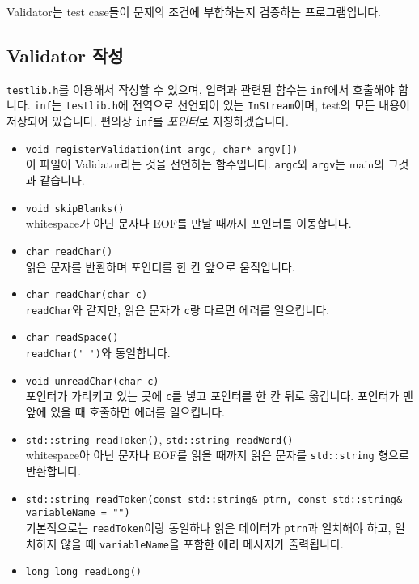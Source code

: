 \documentclass{article}
\begin{document}
    Validator는 test case들이 문제의 조건에 부합하는지 검증하는 프로그램입니다.
    \subsection{Validator 작성}
    \verb|testlib.h|를 이용해서 작성할 수 있으며, 입력과 관련된 함수는 \verb|inf|에서 호출해야 합니다. \verb|inf|는 \verb|testlib.h|에 전역으로 선언되어 있는 \verb|InStream|이며, test의 모든 내용이 저장되어 있습니다. 편의상 \verb|inf|를 \textit{포인터}로 지칭하겠습니다.
    \begin{itemize}
        \item \verb|void registerValidation(int argc, char* argv[])|\\
        이 파일이 Validator라는 것을 선언하는 함수입니다. \verb|argc|와 \verb|argv|는 main의 그것과 같습니다.
        \item \verb|void skipBlanks()|\\
        whitespace가 아닌 문자나 EOF를 만날 때까지 포인터를 이동합니다.
        \item \verb|char readChar()|\\
        읽은 문자를 반환하며 포인터를 한 칸 앞으로 움직입니다.
        \item \verb|char readChar(char c)|\\
        \verb|readChar|와 같지만, 읽은 문자가 \verb|c|랑 다르면 에러를 일으킵니다.
        \item \verb|char readSpace()|\\
        \verb|readChar(' ')|와 동일합니다.
        \item \verb|void unreadChar(char c)|\\
        포인터가 가리키고 있는 곳에 \verb|c|를 넣고 포인터를 한 칸 뒤로 옮깁니다. 포인터가 맨 앞에 있을 때 호출하면 에러를 일으킵니다.
        \item \verb|std::string readToken()|, \verb|std::string readWord()|\\
        whitespace아 아닌 문자나 EOF를 읽을 때까지 읽은 문자를 \verb|std::string| 형으로 반환합니다.
        \item \verb|std::string readToken(const std::string& ptrn, const std::string& variableName = "")|\\
        기본적으로는 \verb|readToken|이랑 동일하나 읽은 데이터가 \verb|ptrn|과 일치해야 하고, 일치하지 않을 때 \verb|variableName|을 포함한 에러 메시지가 출력됩니다.
        \item \verb|long long readLong()|\\

\end{itemize}
\end{document}
